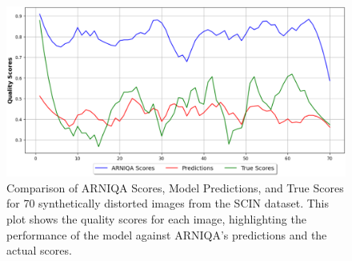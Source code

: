 \begin{figure}[ht]
    \centering
    \includegraphics[keepaspectratio,width=15cm]{img/hept/test_70_arniqa.png}
    \caption{Comparison of ARNIQA Scores, Model Predictions, and True Scores for 70 synthetically distorted images from the SCIN dataset. This plot shows the quality scores for each image, highlighting the performance of the model against ARNIQA’s predictions and the actual scores.}
    \label{fig:T7A}
\end{figure}